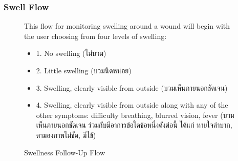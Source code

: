 \documentclass[12pt,oneside,openright,a4paper]{cpe-english-project}
\begin{document}
        \subsubsection{Swell Flow}
          \begin{figure}[H]
            \centering
            \caption{Swellness Follow-Up Flow}\label{fig:FollowUpFlow4}
            \begin{justify}
              \qquad This flow for monitoring swelling around a wound will begin with the user choosing from four levels of swelling:\par
              \begin{itemize}
                \item[] 1. No swelling \textthai{(ไม่บวม)}
                \item[] 2. Little swelling \textthai{(บวมนิดหน่อย)}
                \item[] 3. Swelling, clearly visible from outside \textthai{(บวมเห็นภายนอกชัดเจน)}
                \item[] 4. Swelling, clearly visible from outside along with any of the other symptoms: difficulty breathing, blurred vision, fever \textthai{(บวมเห็นภายนอกชัดเจน ร่วมกับมีอาการข้อใดข้อหนึ่งดังต่อนี้ ได้แก่ หายใจลำบาก, ตามองภาพไม่ชัด, มีไข้)}
              \end{itemize}

\end{justify}
\end{figure}
\end{document}
